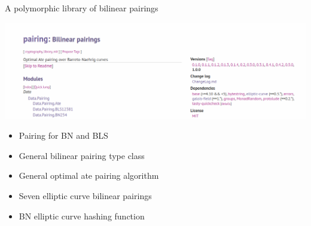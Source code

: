 \documentclass[11pt]{beamer}
\begin{document}
\begin{frame}{A polymorphic library of bilinear pairings}

\pause

\begin{center}

\includegraphics[width=\textwidth]{pairing.png}

\end{center}

\pause

\begin{itemize}[<+->]
\item Pairing for BN and BLS
\item General bilinear pairing type class
\item General optimal ate pairing algorithm
\item Seven elliptic curve bilinear pairings
\item BN elliptic curve hashing function
\end{itemize}

\end{frame}
\end{document}
